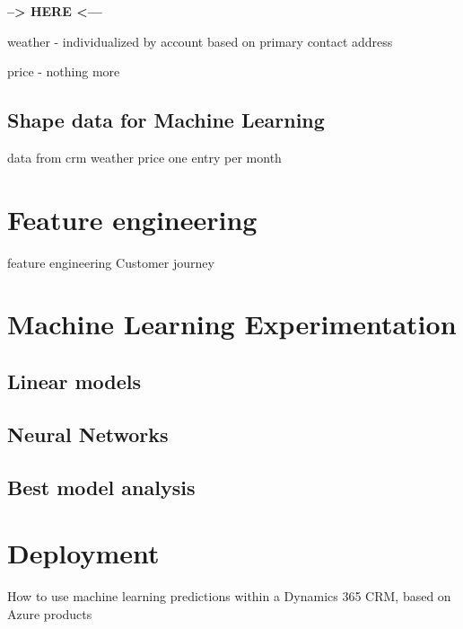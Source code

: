 \begin{center}\textbf{--> HERE <---}\end{center}

weather - individualized by account based on primary contact address

price - nothing more

\subsection{Shape data for Machine Learning }\label{sec:data-shape-for-ml}
data from crm
weather
price
one entry per month



\section{Feature engineering} \label{sec:ml-features}

feature engineering
Customer journey




\section{Machine Learning Experimentation} \label{sec:ml-experimentation}
\lipsum[1]

\subsection{Linear models}
\lipsum[2]

\subsection{Neural Networks}
\lipsum[3]

\subsection{Best model analysis}
\lipsum[3]


\section{Deployment} \label{sec:crm-deployment}
How to use machine learning predictions within a Dynamics 365 CRM, based on Azure products

